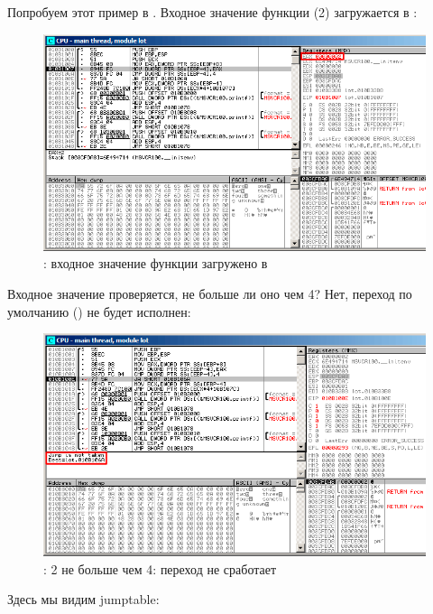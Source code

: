 ﻿\clearpage
\myparagraph{\olly}
\myindex{\olly}

Попробуем этот пример в \olly.
Входное значение функции (2) загружается в \EAX: 

\begin{figure}[H]
\centering
\includegraphics[scale=\FigScale]{patterns/08_switch/2_lot/olly1.png}
\caption{\olly: входное значение функции загружено в \EAX}
\label{fig:switch_lot_olly1}
\end{figure}

\clearpage
Входное значение проверяется, не больше ли оно чем 4? 
Нет, переход по умолчанию () не будет исполнен:

\begin{figure}[H]
\centering
\includegraphics[scale=\FigScale]{patterns/08_switch/2_lot/olly2.png}
\caption{\olly: 2 не больше чем 4: переход не сработает}
\label{fig:switch_lot_olly2}
\end{figure}

\clearpage
Здесь мы видим jumptable:

